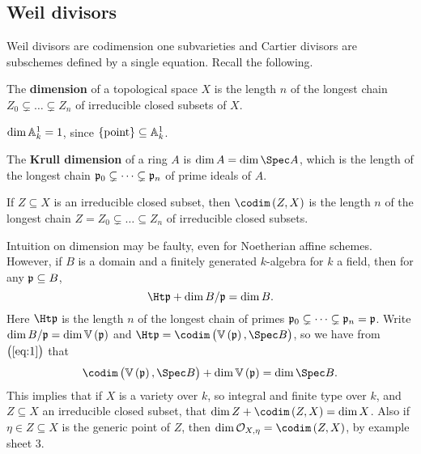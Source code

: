 \subsection{Weil divisors}

Weil divisors are codimension one subvarieties and Cartier divisors are subschemes defined by a single equation. Recall the following.

\begin{definition*}
The \textbf{dimension} of a topological space $ X $ is the length $ n $ of the longest chain $ Z_0 \subsetneq \dots \subsetneq Z_n $ of irreducible closed subsets of $ X $.
\end{definition*}

\begin{example*}
$ \dim \AA_k^1 = 1 $, since $ \cbr{\text{point}} \subseteq \AA_k^1 $.
\end{example*}

\begin{definition*}
The \textbf{Krull dimension} of a ring $ A $ is $ \dim A = \dim \Spec A $, which is the length of the longest chain $ \ppp_0 \subsetneq \dots \subsetneq \ppp_n $ of prime ideals of $ A $.
\end{definition*}

\begin{definition*}
If $ Z \subseteq X $ is an irreducible closed subset, then $ \codim\br{Z, X} $ is the length $ n $ of the longest chain $ Z = Z_0 \subsetneq \dots \subseteq Z_n $ of irreducible closed subsets.
\end{definition*}

\pagebreak

\begin{remark*}
Intuition on dimension may be faulty, even for Noetherian affine schemes. However, if $ B $ is a domain and a finitely generated $ k $-algebra for $ k $ a field, then for any $ \ppp \subseteq B $,
\begin{equation}
\label{eq:1}
\Ht \ppp + \dim B / \ppp = \dim B.
\end{equation}
Here $ \Ht \ppp $ is the length $ n $ of the longest chain of primes $ \ppp_0 \subsetneq \dots \subsetneq \ppp_n = \ppp $. Write $ \dim B / \ppp = \dim \VV\br{\ppp} $ and $ \Ht \ppp = \codim\br{\VV\br{\ppp}, \Spec B} $, so we have from $ \br{\ref{eq:1}} $ that
$$ \codim\br{\VV\br{\ppp}, \Spec B} + \dim \VV\br{\ppp} = \dim \Spec B. $$
This implies that if $ X $ is a variety over $ k $, so integral and finite type over $ k $, and $ Z \subseteq X $ an irreducible closed subset, that $ \dim Z + \codim\br{Z, X} = \dim X $. Also if $ \eta \in Z \subseteq X $ is the generic point of $ Z $, then $ \dim \OOO_{X, \eta} = \codim\br{Z, X} $, by example sheet $ 3 $.
\end{remark*}

